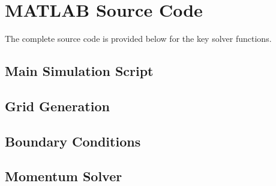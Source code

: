 \documentclass[12pt,a4paper]{article}
\begin{document}
\newpage

\section{MATLAB Source Code}
\label{app:code}

The complete source code is provided below for the key solver functions.

\subsection{Main Simulation Script}


\subsection{Grid Generation}


\subsection{Boundary Conditions}




\subsection{Momentum Solver}




\end{document}
